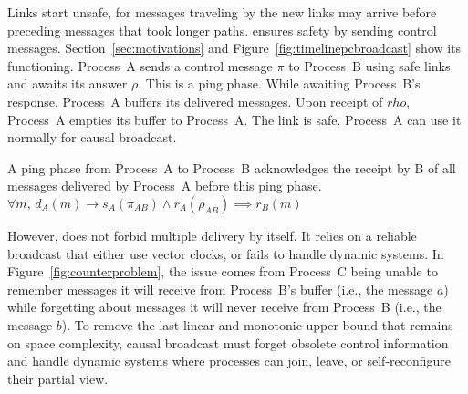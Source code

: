 Links start unsafe, for messages traveling by the new links may arrive before
preceding messages that took longer paths. \PCBROADCAST ensures safety by
sending control messages. Section~\ref{sec:motivations} and
Figure~\ref{fig:timelinepcbroadcast} show its functioning. Process~A sends a
control message $\pi$ to Process~B using safe links and awaits its answer
$\rho$. This is a ping phase. While awaiting Process~B's response, Process~A
buffers its delivered messages. Upon receipt of $rho$, Process~A empties its
buffer to Process~A. The link is safe. Process~A can use it normally for causal
broadcast.


\begin{lemma}
  A ping phase from Process~A to Process~B acknowledges the receipt by B of all
  messages delivered by Process~A before this ping phase.
  $\forall m,\, d_A(m) \rightarrow s_A(\pi_{AB}) \wedge r_A(\rho_{AB}) \implies
  r_B(m)$
\end{lemma}

However, \PCBROADCAST does not forbid multiple delivery by itself. It relies on
a reliable broadcast that either use vector clocks, or fails to handle dynamic
systems.  In Figure~\ref{fig:counterproblem}, the issue comes from Process~C
being unable to remember messages it will receive from Process~B's buffer (i.e.,
the message $a$) while forgetting about messages it will never receive from
Process~B (i.e., the message $b$).  To remove the last linear and monotonic
upper bound that remains on space complexity, causal broadcast must forget
obsolete control information and handle dynamic systems where processes can
join, leave, or self-reconfigure their partial view.


